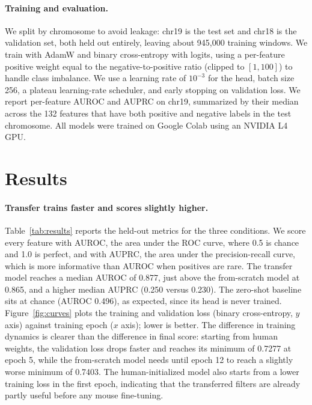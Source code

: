 \documentclass{article}
\begin{document}
\paragraph{Training and evaluation.}
We split by chromosome to avoid leakage: chr19 is the test set and chr18 is the
validation set, both held out entirely, leaving about 945{,}000 training windows.
We train with AdamW and binary cross-entropy with logits, using a per-feature
positive weight equal to the negative-to-positive ratio (clipped to $[1, 100]$)
to handle class imbalance. We use a learning rate of $10^{-3}$ for the head,
batch size 256, a plateau learning-rate scheduler, and early stopping on
validation loss. We report per-feature AUROC and AUPRC on chr19, summarized by
their median across the 132 features that have both positive and negative labels
in the test chromosome. All models were trained on Google Colab using an NVIDIA
L4 GPU.

\section{Results}

\paragraph{Transfer trains faster and scores slightly higher.}
Table~\ref{tab:results} reports the held-out metrics for the three conditions. We
score every feature with AUROC, the area under the ROC curve, where 0.5 is chance
and 1.0 is perfect, and with AUPRC, the area under the precision-recall curve,
which is more informative than AUROC when positives are rare. The transfer model
reaches a median AUROC of 0.877, just above the from-scratch model at 0.865, and a
higher median AUPRC (0.250 versus 0.230). The zero-shot baseline sits at chance
(AUROC 0.496), as expected, since its head is never trained.
Figure~\ref{fig:curves} plots the training and validation loss (binary
cross-entropy, $y$ axis) against training epoch ($x$ axis); lower is better. The
difference in training dynamics is clearer than the difference in final score:
starting from human weights, the validation loss drops faster and reaches its
minimum of 0.7277 at epoch 5, while the from-scratch model needs until epoch 12 to
reach a slightly worse minimum of 0.7403. The human-initialized model also starts
from a lower training loss in the first epoch, indicating that the transferred
filters are already partly useful before any mouse fine-tuning.
\end{document}
